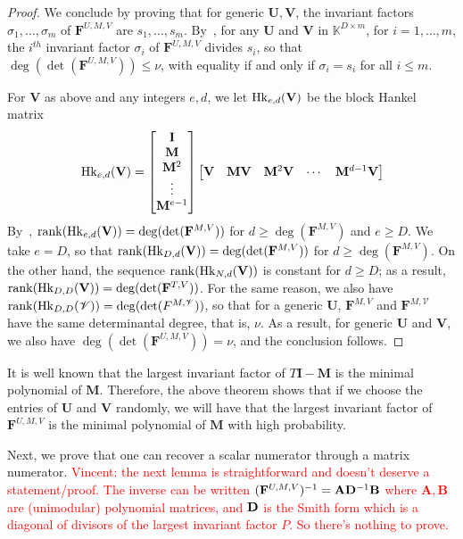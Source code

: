 \documentclass[12pt]{article}
\newcommand{\todo}[1]{\textcolor{red}{#1}}
\newcommand{\mat}[1]{\mathbf{\MakeUppercase{#1}}} %
\def\K {\ensuremath{\mathbb{K}}}
\def\scrV {\ensuremath{\mathscr{V}}}
\def\K{\mathbb{K}}
\def\mA{\mathbf{A}}
\def\mB{\mathbf{B}}
\def\mF{\mathbf{F}}
\def\mI{\mathbf{I}}
\def\mM{\mathbf{M}}
\def\mU{\mathbf{U}}
\def\mV{\mathbf{V}}
\begin{document}
\begin{proof}
	We conclude by proving that for generic $\mU,\mV$, the invariant factors
	$\sigma_1,\dots,\sigma_m$ of $\mF^{U,M,V}$ are $s_1,\dots,s_m$.
	By~\cite[Theorem~2.12]{KaVi04}, for any $\mU$ and $\mV$ in $\K^{D\times
		m}$, for $i=1,\dots,m$, the $i^{th}$ invariant factor $\sigma_i$ of
	$\mF^{U,M,V}$ divides $s_i$, so that $\deg(\det(\mF^{U,M,V}))\le\nu$, with
	equality if and only if $\sigma_i=s_i$ for all $i \le m$.
	
	For $\mV$ as above and any integers $e,d$, we let ${\rm Hk}_{e,d}(\mV)$ be
	the block Hankel matrix
	$$ {\rm Hk}_{e,d}(\mV) =
	\begin{bmatrix}
	\mI \\  \mM \\  \mM^2 \\ \vdots  \\  \mM^{e-1}
	\end{bmatrix}
	\begin{bmatrix}
	\mV & \mM\mV & \mM^2\mV &\cdots&  \mM^{d-1}\mV
	\end{bmatrix}
	$$ By~\cite[Eq.~(2.6)]{KaVi04}, ${\rm rank}({\rm Hk}_{e,d}(\mV)) =
	\deg(\det(\mF^{M,V}))$ for $d \ge \deg(\mF^{M,V})$ and $e \ge D$.  We take
	$e=D$, so that ${\rm rank}({\rm Hk}_{D,d}(\mV)) = \deg(\det(\mF^{M,V}))$
	for $d \ge \deg(\mF^{M,V})$. On the other hand, the sequence ${\rm
		rank}({\rm Hk}_{N,d}(\mV))$ is constant for $d \ge D$; as a result,
	${\rm rank}({\rm Hk}_{D,D}(\mV)) = \deg(\det(\mF^{T,V}))$. For the same
	reason, we also have ${\rm rank}({\rm Hk}_{D,D}(\scrV)) =
	\deg(\det(F^{M,\scrV}))$, so that for a generic $\mU$, $\mF^{M,V}$ and
	$\mF^{M,\scrV}$ have the same determinantal degree, that is, $\nu$.  As
	a result, for generic $\mU$ and $\mV$, we also have
	$\deg(\det(\mF^{U,M,V}))=\nu$, and the conclusion follows.
\end{proof} 

It is well known that the largest invariant factor of
$T\mI - \mM$ is the minimal polynomial of $\mM$. Therefore, the above
theorem shows that if we choose the entries of $\mU$ and $\mV$
randomly, we will have that the
largest invariant factor of $\mF^{U,M,V}$ is the minimal
polynomial of $\mM	$  with high probability.

Next, we prove that one can recover a scalar numerator through a matrix
numerator.  \todo{Vincent: the next lemma is straightforward and doesn't
  deserve a statement/proof. The inverse can be written $(\mF^{U,M,V})^{-1} =
  \mA\mat{D}^{-1}\mB$ where $\mA,\mB$ are (unimodular) polynomial matrices, and
$\mat{D}$ is the Smith form which is a diagonal of divisors of the largest
invariant factor $P$. So there's nothing to prove.}
\end{document}
